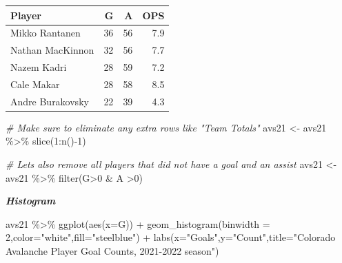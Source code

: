 \documentclass[
  11pt,
]{book}
\newenvironment{Shaded}{\begin{snugshade}}{\end{snugshade}}
\newcommand{\AttributeTok}[1]{\textcolor[rgb]{0.77,0.63,0.00}{#1}}
\newcommand{\CommentTok}[1]{\textcolor[rgb]{0.56,0.35,0.01}{\textit{#1}}}
\newcommand{\DecValTok}[1]{\textcolor[rgb]{0.00,0.00,0.81}{#1}}
\newcommand{\FunctionTok}[1]{\textcolor[rgb]{0.00,0.00,0.00}{#1}}
\newcommand{\NormalTok}[1]{#1}
\newcommand{\OtherTok}[1]{\textcolor[rgb]{0.56,0.35,0.01}{#1}}
\newcommand{\SpecialCharTok}[1]{\textcolor[rgb]{0.00,0.00,0.00}{#1}}
\newcommand{\StringTok}[1]{\textcolor[rgb]{0.31,0.60,0.02}{#1}}
\theoremstyle{definition}
\theoremstyle{definition}
\theoremstyle{definition}
\theoremstyle{definition}
\theoremstyle{remark}
\begin{document}
\begin{tabular}{lrrr}
\toprule
Player & G & A & OPS\\
\midrule
Mikko Rantanen & 36 & 56 & 7.9\\
Nathan MacKinnon & 32 & 56 & 7.7\\
Nazem Kadri & 28 & 59 & 7.2\\
Cale Makar & 28 & 58 & 8.5\\
Andre Burakovsky & 22 & 39 & 4.3\\
\bottomrule
\end{tabular}

\newpage

\begin{Shaded}
\begin{Highlighting}[]
\CommentTok{\# Make sure to eliminate any extra rows like "Team Totals"}
\NormalTok{avs21 }\OtherTok{\textless{}{-}}\NormalTok{ avs21 }\SpecialCharTok{\%\textgreater{}\%} \FunctionTok{slice}\NormalTok{(}\DecValTok{1}\SpecialCharTok{:}\FunctionTok{n}\NormalTok{()}\SpecialCharTok{{-}}\DecValTok{1}\NormalTok{)}

\CommentTok{\# Let\textquotesingle{}s also remove all players that did not have a goal and an assist}
\NormalTok{avs21 }\OtherTok{\textless{}{-}}\NormalTok{ avs21 }\SpecialCharTok{\%\textgreater{}\%} \FunctionTok{filter}\NormalTok{(G}\SpecialCharTok{\textgreater{}}\DecValTok{0} \SpecialCharTok{\&}\NormalTok{ A }\SpecialCharTok{\textgreater{}}\DecValTok{0}\NormalTok{)}
\end{Highlighting}
\end{Shaded}

\textbf{\emph{Histogram}}

\begin{Shaded}
\begin{Highlighting}[]
\NormalTok{avs21 }\SpecialCharTok{\%\textgreater{}\%} \FunctionTok{ggplot}\NormalTok{(}\FunctionTok{aes}\NormalTok{(}\AttributeTok{x=}\NormalTok{G)) }\SpecialCharTok{+} \FunctionTok{geom\_histogram}\NormalTok{(}\AttributeTok{binwidth =} \DecValTok{2}\NormalTok{,}\AttributeTok{color=}\StringTok{"white"}\NormalTok{,}\AttributeTok{fill=}\StringTok{"steelblue"}\NormalTok{) }\SpecialCharTok{+} 
  \FunctionTok{labs}\NormalTok{(}\AttributeTok{x=}\StringTok{"Goals"}\NormalTok{,}\AttributeTok{y=}\StringTok{"Count"}\NormalTok{,}\AttributeTok{title=}\StringTok{"Colorado Avalanche Player Goal Counts, 2021{-}2022 season"}\NormalTok{)}
\end{Highlighting}
\end{Shaded}
\end{document}
